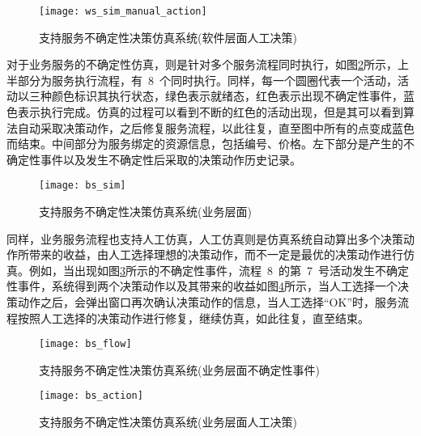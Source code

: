 \begin{figure}[htbp]
    \centering
    \texttt{[image: ws\_sim\_manual\_action]}
    \caption{支持服务不确定性决策仿真系统(软件层面人工决策)}\label{figure:ws_sim_manual_action}
    \vspace{-1em}
\end{figure}

对于业务服务的不确定性仿真，则是针对多个服务流程同时执行，如图\ref{figure:bs_sim}所示，上半部分为服务执行流程，有~8~个同时执行。同样，每一个圆圈代表一个活动，活动以三种颜色标识其执行状态，绿色表示就绪态，红色表示出现不确定性事件，蓝色表示执行完成。仿真的过程可以看到不断的红色的活动出现，但是其可以看到算法自动采取决策动作，之后修复服务流程，以此往复，直至图中所有的点变成蓝色而结束。中间部分为服务绑定的资源信息，包括编号、价格。左下部分是产生的不确定性事件以及发生不确定性后采取的决策动作历史记录。

\begin{figure}[htbp]
    \centering
    \texttt{[image: bs\_sim]}
    \caption{支持服务不确定性决策仿真系统(业务层面)}\label{figure:bs_sim}
    \vspace{-1em}
\end{figure}

同样，业务服务流程也支持人工仿真，人工仿真则是仿真系统自动算出多个决策动作所带来的收益，由人工选择理想的决策动作，而不一定是最优的决策动作进行仿真。例如，当出现如图\ref{figure:bs_flow}所示的不确定性事件，流程~8~的第~7~号活动发生不确定性事件，系统得到两个决策动作以及其带来的收益如图\ref{figure:bs_action}所示，当人工选择一个决策动作之后，会弹出窗口再次确认决策动作的信息，当人工选择“OK”时，服务流程按照人工选择的决策动作进行修复，继续仿真，如此往复，直至结束。

\begin{figure}[htbp]
    \centering
    \texttt{[image: bs\_flow]}
    \caption{支持服务不确定性决策仿真系统(业务层面不确定性事件)}\label{figure:bs_flow}
    \vspace{-1em}
\end{figure}


\begin{figure}[htbp]
    \centering
    \texttt{[image: bs\_action]}
    \caption{支持服务不确定性决策仿真系统(业务层面人工决策)}\label{figure:bs_action}
    \vspace{-1em}
\end{figure}

